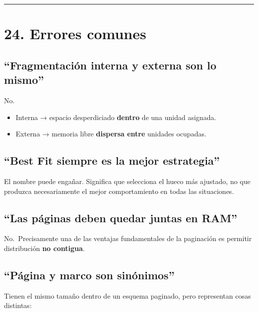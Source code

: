 \documentclass[
  spanish,
  letterpaper,
]{scrbook}
\providecommand{\tightlist}{%
  \setlength{\itemsep}{0pt}\setlength{\parskip}{0pt}}
\begin{document}
\begin{center}\rule{0.5\linewidth}{0.5pt}\end{center}


\chapter{24. Errores comunes}\label{errores-comunes}

\section{``Fragmentación interna y externa son lo
mismo''}\label{fragmentaciuxf3n-interna-y-externa-son-lo-mismo}

No.

\begin{itemize}
\tightlist
\item
  Interna → espacio desperdiciado \textbf{dentro} de una unidad
  asignada.
\item
  Externa → memoria libre \textbf{dispersa entre} unidades ocupadas.
\end{itemize}

\section{``Best Fit siempre es la mejor
estrategia''}\label{best-fit-siempre-es-la-mejor-estrategia}

El nombre puede engañar. Significa que selecciona el hueco más ajustado,
no que produzca necesariamente el mejor comportamiento en todas las
situaciones.

\section{``Las páginas deben quedar juntas en
RAM''}\label{las-puxe1ginas-deben-quedar-juntas-en-ram}

No.~Precisamente una de las ventajas fundamentales de la paginación es
permitir distribución \textbf{no contigua}.

\section{``Página y marco son
sinónimos''}\label{puxe1gina-y-marco-son-sinuxf3nimos}

Tienen el mismo tamaño dentro de un esquema paginado, pero representan
cosas distintas:
\end{document}
